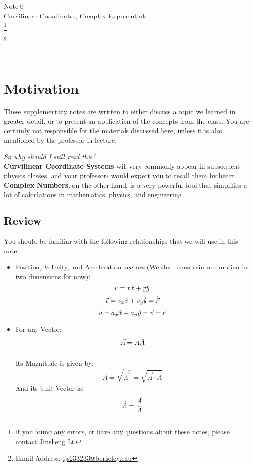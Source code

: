 \documentclass[11pt]{article}
\newcommand\blfootnote[1]{
    \begingroup
    \renewcommand\thefootnote{}\footnote{#1}
    \addtocounter{footnote}{-1}
    \endgroup
}
\theoremstyle{gangnamstyle}{\newtheorem{definition}{Definition}[]}
\theoremstyle{gangnamstyle}{\newtheorem{example}{Example}[]}
\theoremstyle{gangnamstyle}{\newtheorem{problem}{Problem}[]}
\begin{document}
\normalfont
\pagestyle{pages}


\begin{center}
\vspace{3in}
{\Large Note 0 } \\[0.05in]
Curvilinear Coordinates, Complex Exponentials  \\ 
\blfootnote{If you found any errors, or have any questions about these notes, please contact Jinsheng Li.} \blfootnote{Email Address: \href{mailto:ljs233233@berkeley.edu}{ljs233233@berkeley.edu}} \\ [-0.5in]
\end{center}

\section*{Motivation}

These supplementary notes are written to either discuss a topic we learned in greater detail, or to present an application of the concepts from the class. You are certainly not responsible for the materials discussed here, unless it is also mentioned by the professor in lecture. 

\textit{So why should I still read this?} \\
\textbf{Curvilinear Coordinate Systems} will very commonly appear in subsequent physics classes, and your professors would expect you to recall them by heart. \textbf{Complex Numbers}, on the other hand, is a very powerful tool that simplifies a lot of calculations in mathematics, physics, and engineering. 

\subsection*{Review}

You should be familiar with the following relationships that we will use in this note. 

\begin{itemize}
\item Position, Velocity, and Acceleration vectors (We shall constrain our motion in two dimensions for now): 
\[ \Vec{r} = x\Hat{x} + y\Hat{y} \]
\[ \Vec{v} = v_x\Hat{x} + v_y\Hat{y} = \Dot{\Vec{r}} \]
\[ \Vec{a} = a_x\Hat{x} + a_y\Hat{y} = \Dot{\Vec{v}} = \Ddot{\Vec{r}} \]
\item For any Vector: 
\[ \Vec{A} = A\Hat{A} \] \\
Its Magnitude is given by: 
\[ A = \sqrt{\Vec{A}^2} = \sqrt{\Vec{A} \cdot \Vec{A}} \]
And its Unit Vector is: 
\[ \Hat{A} = \frac{\Vec{A}}{A} \]
\end{itemize}
\pagebreak
\end{document}

